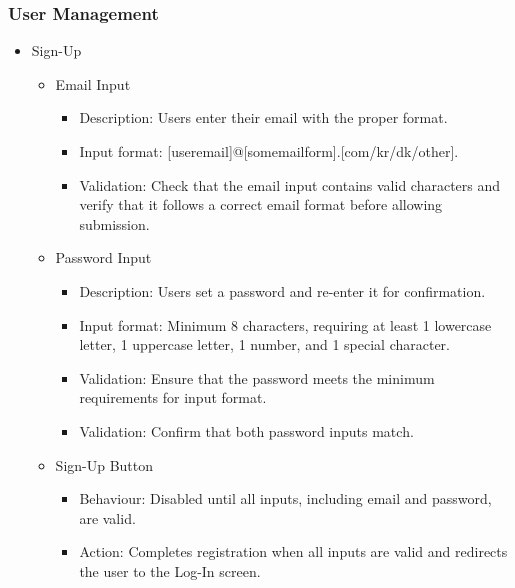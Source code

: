 \documentclass[conference]{IEEEtran}
\begin{document}
\subsubsection{User Management}
\begin{itemize}
    \item Sign-Up
    \begin{itemize}
        \item Email Input
        \begin{itemize}
            \item Description: Users enter their email with the proper format.
            \item \raggedright Input format: [useremail]@[somemailform].[com/kr/dk/other].
            \item Validation: Check that the email input contains valid characters and verify that it follows a correct email format before allowing submission.
        \end{itemize}
        \item Password Input
        \begin{itemize}
            \item Description: Users set a password and re-enter it for confirmation.
            \item Input format: Minimum 8 characters, requiring at least 1 lowercase letter, 1 uppercase letter, 1 number, and 1 special character.
            \item Validation: Ensure that the password meets the minimum requirements for input format.
            \item Validation: Confirm that both password inputs match.
        \end{itemize}
        \item Sign-Up Button
        \begin{itemize}
            \item Behaviour: Disabled until all inputs, including email and password, are valid.
            \item Action: Completes registration when all inputs are valid and redirects the user to the Log-In screen.
        \end{itemize}
    \end{itemize}


\end{itemize}
\end{document}
